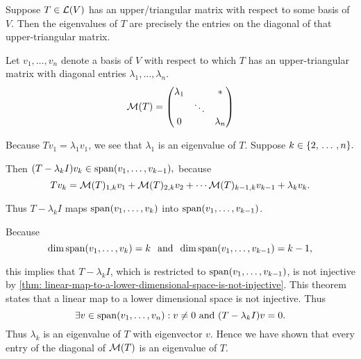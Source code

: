\begin{thm}
  \label{thm:determination-of-eigenvalue-from-upper-triangular-matrix}
  Suppose $T\in \mathcal{L}(V)$ has an upper\-/triangular matrix with respect to some basis of $V$. Then the eigenvalues of $T$ are precisely the entries on the diagonal of that upper-triangular matrix.

\end{thm}
\begin{prf}
  Let $v_1, \ldots, v_n$ denote a basis of $V$ with respect to which $T$ has an upper-triangular matrix with diagonal entries $\lambda_1, \ldots, \lambda_n$.
  \begin{equation}
    \mathcal{M}(T) =
    \begin{pmatrix}
        \lambda_1 &         &  * \\
                  &  \ddots &    \\
           0      &         & \lambda_n
    \end{pmatrix}
  \end{equation}

  Because $T v_1 = \lambda_1 v_1$, we see that $\lambda_1$ is an eigenvalue of $T$.
  Suppose $k \in \{2, {\, \ldots \,\,}, n\}.$

  Then $(T-\lambda_k I) v_k \in \operatorname{span} (v_1, \ldots, v_{k-1}),$ because
  \begin{equation}
    T v_k = \mathcal{M}(T)_{1,k} v_1 + \mathcal{M}(T)_{2,k}v_2 + \cdots \mathcal{M}(T)_{k-1,k} v_{k-1} + \lambda_k v_k.
  \end{equation}

  Thus $T-\lambda_k I$ maps $\operatorname{span} (v_1, \ldots, v_k)$ into $\operatorname{span} (v_1, \ldots, v_{k-1})$.

  Because
  \begin{equation}
    \dim \operatorname{span} (v_1, \ldots, v_k) = k \;\;\, \text{and}\;\; \dim \operatorname{span} (v_1, \ldots, v_{k-1}) = k-1,
  \end{equation}

  this implies that $T-\lambda_k I$, which is restricted to $\operatorname{span} (v_1, \ldots, v_{k-1})$, is not injective by \ref{thm: linear-map-to-a-lower-dimensional-space-is-not-injective}. This theorem states that a linear map to a lower dimensional space is not injective. Thus
  \begin{equation}
    \exists v \in \myspan{v_1, \ldots, v_n}: v\neq0$ and $(T-\lambda_k I)v=0.
  \end{equation}
  Thus $\lambda_k$ is an eigenvalue of $T$ with eigenvector $v$. Hence we have shown that every entry of the diagonal of $\mathcal{M}(T)$ is an eigenvalue of $T$.


\end{prf}
